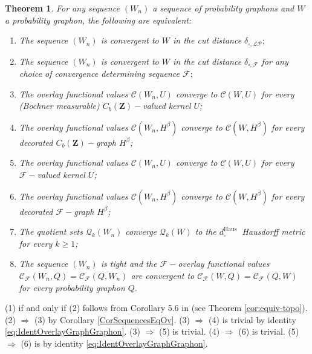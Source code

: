 \documentclass[11pt]{article}
\newtheorem{theorem}{Theorem}[section]
\newcommand{\cF}{{\mathcal F}}  %
\newcommand{\Space}{\mathbf{Z}}
\newcommand{\CbFunct}{C_b(\Space)}
\begin{document}
\begin{theorem}\label{ThmEquivalenceConvQuotientOverlayVersion2}
For any sequence $\left(W_n\right)$ a sequence of probability graphons and $W$ a probability graphon, the following are equivalent:
\begin{enumerate}

\item  The sequence $\left(W_n\right)$ is convergent to $W$ in the cut distance $\delta_{\square,\mathcal{LP}};$
\item  The sequence $\left(W_n\right)$ is convergent to $W$ in the cut distance $\delta_{\square,\cF}$ for any choice of convergence determining sequence $\cF;$
\item The overlay functional values $\mathcal{C}\left(W_n, U\right)$ converge to $\mathcal{C}\left(W, U\right)$ for every (Bochner measurable) $\CbFunct-$valued kernel $U$;
\item The overlay functional values $\mathcal{C}\left(W_n, H^{\beta}\right)$ converge to $\mathcal{C}\left(W, H^{\beta}\right)$ for every decorated $\CbFunct-$graph $H^{\beta}$;
\item The overlay functional values $\mathcal{C}\left(W_n, U\right)$ converge to $\mathcal{C}\left(W, U\right)$ for every $\cF-$valued kernel $U$;
\item The overlay functional values $\mathcal{C}\left(W_n, H^{\beta}\right)$ converge to $\mathcal{C}\left(W, H^{\beta}\right)$ for every decorated $\cF-$graph $H^{\beta}$;
\item The quotient sets $\mathcal{Q}_k\left(W_n\right)$ converge $\mathcal{Q}_k\left(W\right)$ to  the $d_{\square}^{\text {Haus }}$ Hausdorff metric for every $k \geq 1$;
\item  The sequence $\left(W_n\right)$ is tight and the $\cF-$overlay functional values $\mathcal{C_{\cF}}\left(W_n, Q\right)=\mathcal{C_{\cF}}\left(Q,W_n\right)$ are convergent to $\mathcal{C_{\cF}}\left(W, Q\right)=\mathcal{C_{\cF}}\left(Q,W\right)$ for every probability graphon $Q.$
\end{enumerate}
\end{theorem}
\proof 
(1) if and only if (2) follows from Corollary 5.6 in \cite{abraham2023probabilitygraphons} (see Theorem \ref{cor:equiv-topo}). \newline
(2) $\Rightarrow$ (3) by Corollary \ref{CorSequencesEqOv}. \newline
(3) $\Rightarrow$ (4) is trivial by identity \eqref{eq:IdentOverlayGraphGraphon}.\newline
(3) $\Rightarrow$ (5) is trivial.\newline
(4) $\Rightarrow$ (6) is trivial.\newline
(5) $\Rightarrow$ (6) is by identity \eqref{eq:IdentOverlayGraphGraphon}.\newline
\end{document}
